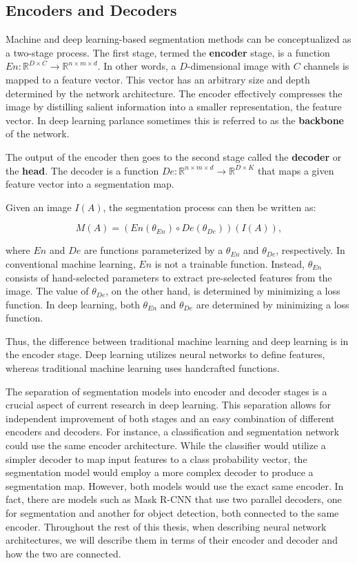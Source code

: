 \subsection{Encoders and Decoders}

Machine and deep learning-based segmentation methods can be conceptualized as a two-stage process. The first stage, termed the \textbf{encoder} stage, is a function $En : \mathbb{R}^{D \times C} \rightarrow \mathbb{R}^{n \times m \times d}$. In other words, a $D$-dimensional image with $C$ channels is mapped to a feature vector. This vector has an arbitrary size and depth determined by the network architecture. The encoder effectively compresses the image by distilling salient information into a smaller representation, the feature vector. In deep learning parlance sometimes this is referred to as the \textbf{backbone} of the network.

The output of the encoder then goes to the second stage called the \textbf{decoder} or the \textbf{head}. The decoder is a function $De : \mathbb{R}^{n \times m \times d} \rightarrow \mathbb{R}^{D \times K}$ that maps a given feature vector into a segmentation map. 

Given an image $I(A)$, the segmentation process can then be written as:

\begin{equation}
M(A) = (En(\theta_{En}) \circ De(\theta_{De}))(I(A)),
\end{equation}

where $En$ and $De$ are functions parameterized by a $\theta_{En}$ and $\theta_{De}$, respectively. In conventional machine learning, $En$ is not a trainable function. Instead, $\theta_{En}$ consists of hand-selected parameters to extract pre-selected features from the image. The value of $\theta_{De}$, on the other hand, is determined by minimizing a loss function. In deep learning, both $\theta_{En}$ and $\theta_{De}$ are determined by minimizing a loss function.

Thus, the difference between traditional machine learning and deep learning is in the encoder stage. Deep learning utilizes neural networks to define features, whereas traditional machine learning uses handcrafted functions.

The separation of segmentation models into encoder and decoder stages is a crucial aspect of current research in deep learning. This separation allows for independent improvement of both stages and an easy combination of different encoders and decoders. For instance, a classification and segmentation network could use the same encoder architecture. While the classifier would utilize a simpler decoder to map input features to a class probability vector, the segmentation model would employ a more complex decoder to produce a segmentation map. However, both models would use the exact same encoder. In fact, there are models such as Mask R-CNN \cite{heMaskRCNN2017b} that use two parallel decoders, one for segmentation and another for object detection, both connected to the same encoder. Throughout the rest of this thesis, when describing neural network architectures, we will describe them in terms of their encoder and decoder and how the two are connected.

